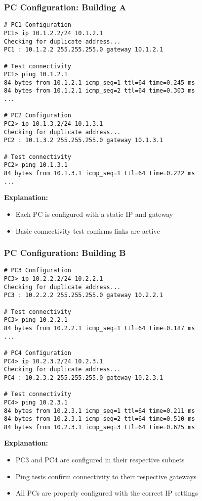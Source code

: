 \documentclass{beamer}
\begin{document}
\begin{frame}
\frametitle{PC Configuration: Building A}
\begin{lstlisting}[escapechar=|]
# PC1 Configuration
PC1> ip 10.1.2.2/24 10.1.2.1
Checking for duplicate address...
PC1 : 10.1.2.2 255.255.255.0 gateway 10.1.2.1

# Test connectivity
PC1> ping 10.1.2.1
84 bytes from 10.1.2.1 icmp_seq=1 ttl=64 time=0.245 ms
84 bytes from 10.1.2.1 icmp_seq=2 ttl=64 time=0.303 ms
...

# PC2 Configuration
PC2> ip 10.1.3.2/24 10.1.3.1
Checking for duplicate address...
PC2 : 10.1.3.2 255.255.255.0 gateway 10.1.3.1

# Test connectivity
PC2> ping 10.1.3.1
84 bytes from 10.1.3.1 icmp_seq=1 ttl=64 time=0.222 ms
...
\end{lstlisting}

\textbf{Explanation:}
\begin{itemize}
    \item Each PC is configured with a static IP and gateway
    \item Basic connectivity test confirms links are active
\end{itemize}
\end{frame}

\begin{frame}
\frametitle{PC Configuration: Building B}
\begin{lstlisting}[escapechar=|]
# PC3 Configuration
PC3> ip 10.2.2.2/24 10.2.2.1
Checking for duplicate address...
PC3 : 10.2.2.2 255.255.255.0 gateway 10.2.2.1

# Test connectivity
PC3> ping 10.2.2.1
84 bytes from 10.2.2.1 icmp_seq=1 ttl=64 time=0.187 ms
...

# PC4 Configuration
PC4> ip 10.2.3.2/24 10.2.3.1
Checking for duplicate address...
PC4 : 10.2.3.2 255.255.255.0 gateway 10.2.3.1

# Test connectivity
PC4> ping 10.2.3.1
84 bytes from 10.2.3.1 icmp_seq=1 ttl=64 time=0.211 ms
84 bytes from 10.2.3.1 icmp_seq=2 ttl=64 time=0.510 ms
84 bytes from 10.2.3.1 icmp_seq=3 ttl=64 time=0.625 ms
\end{lstlisting}

\textbf{Explanation:}
\begin{itemize}
    \item PC3 and PC4 are configured in their respective subnets
    \item Ping tests confirm connectivity to their respective gateways
    \item All PCs are properly configured with the correct IP settings
\end{itemize}
\end{frame}
\end{document}
